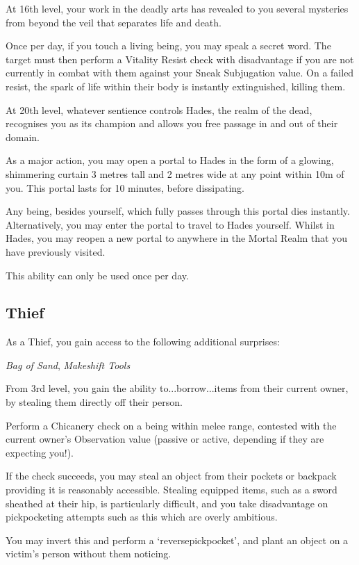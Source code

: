 {
At 16th level, your work in the deadly arts has revealed to you several mysteries from beyond the veil that separates life and death.

Once per day, if you touch a living being, you may speak a secret word. The target must then perform a Vitality Resist check \minus{} with disadvantage if you are not currently in combat with them \minus{}  against your Sneak Subjugation value. On a failed resist, the spark of life within their body is instantly extinguished, killing them. 
}

{
At 20th level, whatever sentience controls Hades, the realm of the dead, recognises you as its champion \minus{} and allows you free passage in and out of their domain. 

As a major action, you may open a portal to Hades in the form of a glowing, shimmering curtain 3 metres tall and 2 metres wide at any point within 10m of you. This portal lasts for 10 minutes, before dissipating. 

Any being, besides yourself, which fully passes through this portal dies instantly. Alternatively, you may enter the portal to travel to Hades yourself. Whilst in Hades, you may reopen a new portal to anywhere in the Mortal Realm that you have previously visited. 

This ability can only be used once per day. 
}
\subsection*{\bf Thief}

{
As a Thief, you gain access to the following additional surprises:

{\it Bag of Sand}, {\it Makeshift Tools}
}


{
From 3rd level, you gain the ability to...borrow...items from their current owner, by stealing them directly off their person. 

Perform a Chicanery check on a being within melee range, contested with the current owner's Observation value (passive or active, depending if they are expecting you!). 

If the check succeeds, you may steal an object from their pockets or backpack \minus{} providing it is reasonably accessible. Stealing equipped items, such as a sword sheathed at their hip, is particularly difficult, and you take disadvantage on pickpocketing attempts such as this which are overly ambitious.   

You may invert this and perform a `reverse\minus{}pickpocket', and plant an object on a victim's person without them noticing. 
}


